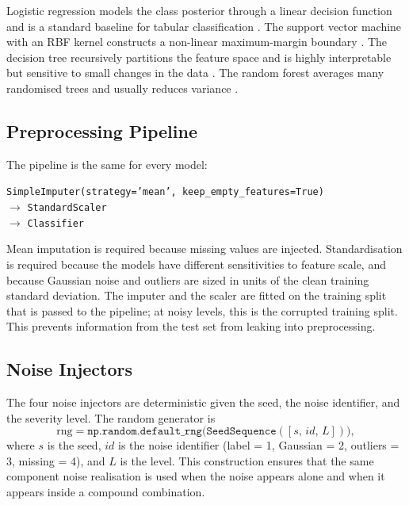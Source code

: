 Logistic regression models the class posterior through a linear decision function and is a standard baseline for tabular classification \cite{hastie2009elements}. The support vector machine with an RBF kernel constructs a non-linear maximum-margin boundary \cite{cortes1995support}. The decision tree recursively partitions the feature space and is highly interpretable but sensitive to small changes in the data \cite{quinlan1986induction}. The random forest averages many randomised trees and usually reduces variance \cite{breiman2001random}.

\subsection{Preprocessing Pipeline}

The pipeline is the same for every model:
\begin{center}
\texttt{SimpleImputer(strategy='mean', keep\_empty\_features=True)} \\
$\rightarrow$ \texttt{StandardScaler} \\
$\rightarrow$ \texttt{Classifier}
\end{center}

Mean imputation is required because missing values are injected. Standardisation is required because the models have different sensitivities to feature scale, and because Gaussian noise and outliers are sized in units of the clean training standard deviation. The imputer and the scaler are fitted on the training split that is passed to the pipeline; at noisy levels, this is the corrupted training split. This prevents information from the test set from leaking into preprocessing.

\subsection{Noise Injectors}

The four noise injectors are deterministic given the seed, the noise identifier, and the severity level. The random generator is
\begin{equation}
\text{rng} = \texttt{np.random.default\_rng}\big(\texttt{SeedSequence}([s, \, id, \, L])\big),
\label{eq:rng}
\end{equation}
where $s$ is the seed, $id$ is the noise identifier (label = 1, Gaussian = 2, outliers = 3, missing = 4), and $L$ is the level. This construction ensures that the same component noise realisation is used when the noise appears alone and when it appears inside a compound combination.

